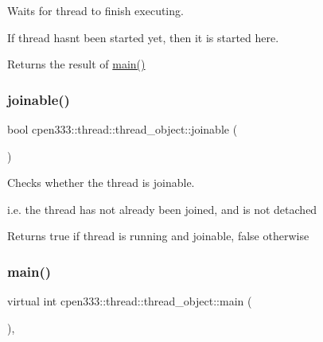 Waits for thread to finish executing. 

If thread hasn\textquotesingle{}t been started yet, then it is started here.

\begin{DoxyReturn}{Returns}
the result of \hyperlink{classcpen333_1_1thread_1_1thread__object_adbd74f6f7461d90a1c12e8078aa5f3af}{main()} 
\end{DoxyReturn}
\mbox{\label{classcpen333_1_1thread_1_1thread__object_a374e31ea56accc37a3468012a411da5d}} 
\subsubsection{\texorpdfstring{joinable()}{joinable()}}
{\footnotesize\ttfamily bool cpen333\+::thread\+::thread\+\_\+object\+::joinable (\begin{DoxyParamCaption}{ }\end{DoxyParamCaption})\hspace{0.3cm}{\ttfamily [inline]}}



Checks whether the thread is joinable. 

i.\+e. the thread has not already been joined, and is not detached

\begin{DoxyReturn}{Returns}
true if thread is running and joinable, false otherwise 
\end{DoxyReturn}
\mbox{\label{classcpen333_1_1thread_1_1thread__object_adbd74f6f7461d90a1c12e8078aa5f3af}} 
\subsubsection{\texorpdfstring{main()}{main()}}
{\footnotesize\ttfamily virtual int cpen333\+::thread\+::thread\+\_\+object\+::main (\begin{DoxyParamCaption}{ }\end{DoxyParamCaption})\hspace{0.3cm}{\ttfamily [protected]}, {}}



